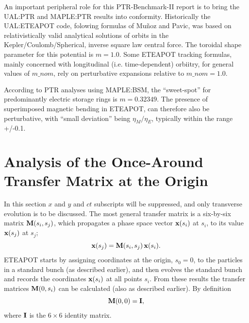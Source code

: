 \documentclass[]{article}
\begin{document}
 An important peripheral role for this PTR-Benchmark-II report is to bring the UAL:PTR and MAPLE:PTR
results into conformity.  Historically the UAL:ETEAPOT code, folowing formulas of Mu\~noz and 
Pavic\cite{Munoz}, was based on relativistically valid analytical solutions of orbits in the 
Kepler/Coulomb/Spherical, inverse square law central force. The toroidal shape parameter for this
potential is $m=1.0$.  Some ETEAPOT tracking formulas, mainly concerned with longitudinal 
(i.e. time-dependent) orbiitry, for general values of $m\_nom$, rely on perturbative expansions relative
to $m\_nom=1.0$.  

According to PTR analyses using MAPLE:BSM, the ``sweet-spot'' for predominantly electric storage rings
is $m=0.32349$.  The presence of superimposed magnetic bending in ETEAPOT, can therefore
also be perturbative, with ``small deviation'' being $\eta_M/\eta_E$, typically within the range +/-0.1.  





\clearpage



\section{Analysis of the Once-Around Transfer Matrix at the Origin}
In this section $x$ and $y$ and $ct$ subscripts will be suppressed,
and only transverse evolution is to be discussed. 
The most general
transfer matrix is a six-by-six matrix ${\bf M}(s_i,s_j)$, which propagates a
phase space vector ${\bf x}(s_i)$ at $s_i$, to its value ${\bf x}(s_j)$ at $s_j$;
%
\begin{equation}
{\bf x}(s_j) 
 =
{\bf M}(s_i,s_j)\,
{\bf x}(s_i). 
\label{TM.1}
\end{equation}
%
ETEAPOT starts by assigning coordinates at the origin, $s_0=0$,
to the particles in a standard bunch (as described earlier), and then
evolves the standard bunch and records the coordinates ${\bf x}(s_i)$ 
at all points $s_i$.  From these results the transfer matrices 
${\bf M}(0,s_i)$ can be calculated (also as described earlier). By definition
%
\begin{equation}
{\bf M}(0,0)
 =
{\bf I}, 
\label{TM.2}
\end{equation}
%
where ${\bf I}$ is the $6\times6$ identity matrix. 
\end{document}
